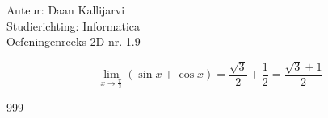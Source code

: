 \documentclass[a4paper]{article}
\begin{document}
\noindent \large Auteur: Daan Kallijarvi \\
\noindent \large Studierichting: Informatica\\
\noindent \large Oefeningenreeks 2D nr. 1.9\\

\medskip

\normalsize

$$\lim\limits_{x \to \tfrac{\pi}{3}} (\sin x + \cos x) = \dfrac{\sqrt{3}}{2} + \dfrac{1}{2} = \dfrac{\sqrt{3}+1}{2}$$

\begin{thebibliography}{999}
\end{thebibliography}
\end{document}
